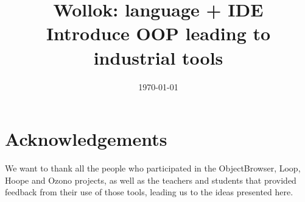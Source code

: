 \documentclass[conference, a4paper]{IEEEtran}
\begin{document}
\title{Wollok: language + IDE\\Introduce OOP leading to industrial tools}

\author{

}

\date{\today}
\maketitle






%





\section*{Acknowledgements}
We want to thank all the people who participated in the ObjectBrowser, Loop, Hoope and Ozono projects, 
as well as the teachers and students that provided feedback from their use of those tools, leading us to the ideas presented here.

{
\small


}
\end{document}
